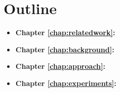 
\section{Outline}
\begin{itemize}
    \item \textbf{Chapter \ref{chap:relatedwork}:} %
    
    \item \textbf{Chapter \ref{chap:background}:} %
    
    \item \textbf{Chapter \ref{chap:approach}:} %
    
    \item \textbf{Chapter \ref{chap:experiments}:} %
\end{itemize}